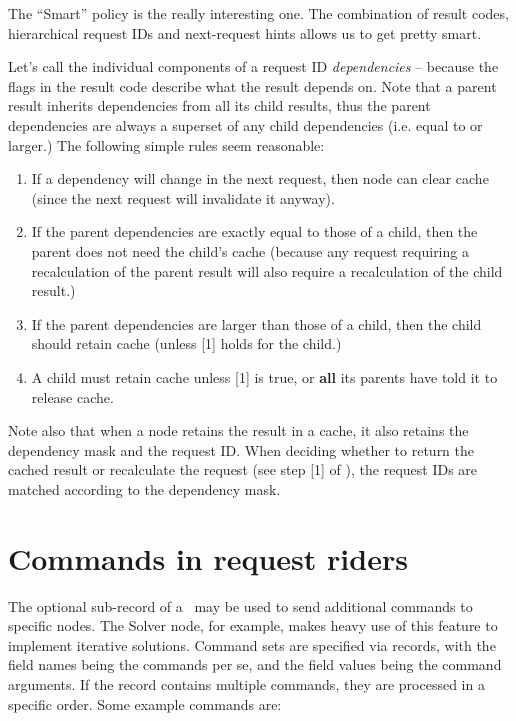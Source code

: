   The ``Smart'' policy is the really interesting one. The combination of result
  codes, hierarchical request IDs and next-request hints allows us to get
  pretty smart. 
  
  Let's call the individual components of a request ID {\em dependencies} --
  because the  flags in the result code describe what the result
  depends on. Note that a parent result inherits dependencies from all its
  child results, thus the parent dependencies are always a superset of any
  child dependencies (i.e. equal to or larger.) The following simple rules seem
  reasonable:

  \begin{enumerate}
  
  \item If a dependency will change in the next request, then node can clear
    cache (since the next request will invalidate it anyway).

  \item If the parent dependencies are exactly equal to those of a child, then
    the parent does not need the child's cache (because any request requiring a
    recalculation of the parent result will also require a recalculation of the
    child result.)

  \item If the parent dependencies are larger than those of a child, then the 
    child should retain cache (unless [1] holds for the child.) 

  \item A child must retain cache unless [1] is true, or {\bf all} its parents
    have told it to release cache.

  \end{enumerate}
  
  Note also that when a node retains the result in a cache, it also retains the
  dependency mask and the request ID. When deciding whether to return the
  cached result or recalculate the request (see step [1] of ),
  the request IDs are matched according to the dependency mask.
  
\section{Commands in request riders}

  The optional  sub-record of a \Request\ may be used to send
  additional commands to specific nodes. The Solver node, for example, makes
  heavy use of this feature to implement iterative solutions. Command sets are
  specified via records, with the field names being the commands per se, and
  the field values being the command arguments. If the record contains multiple
  commands, they are processed in a specific order. Some example commands are:

